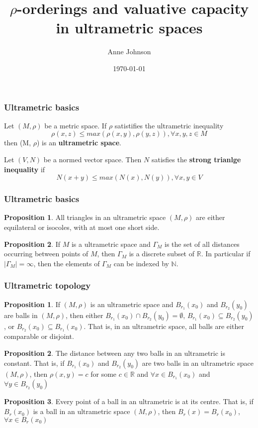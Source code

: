 \documentclass{beamer}
\title{$\rho$-orderings and valuative capacity in ultrametric spaces}
\author{Anne Johnson}
\date{\today}
\theoremstyle{definition}
\newtheorem{proposition}{Proposition}
\newtheorem*{proposition*}{Proposition}
\begin{document}
\maketitle
\begin{frame}
\frametitle{Ultrametric basics}
\begin{definition}
	 Let $(M, \rho)$ be a metric space. If $\rho$ satistifies the ultrametric inequality
	\[\rho(x,z) \leq max{(\rho(x,y), \rho(y,z))}, \forall x,y,z \in M\] 
	then (M, $\rho$) is an \textbf{ultrametric space}.
\end{definition}
\begin{definition}
	 Let $(V, N)$ be a normed vector space. Then $N$ satisfies the \textbf{strong trianlge inequality} if
	\[N(x + y) \leq max(N(x), N(y)), \forall x,y \in V \]
\end{definition}
\end{frame}

\begin{frame}
\frametitle{Ultrametric basics}
\begin{proposition}
	\cite{ar} All triangles in an ultrametric space $(M,\rho)$ are either equilateral or isocoles, with at most one short side. 
\end{proposition}
\begin{proposition}
\cite{ar} If $M$ is a ultrametric space and $\Gamma_M$ is the set of all distances occurring between points of $M$, then $\Gamma_M$ is a discrete subset of $\mathbb{R}$. In particular if $\mid \Gamma_M\mid = \infty$, then the elements of $\Gamma_M$ can be indexed by $\mathbb{N}$.
\end{proposition}

\end{frame}

\begin{frame}
\frametitle{Ultrametric topology}
\begin{proposition*}
\cite{ar} If $(M, \rho)$ is an ultrametric space and $B_{r_1}(x_0)$ and $B_{r_2}(y_0)$ are balls in $(M, \rho)$, then either $B_{r_1}(x_0) \cap B_{r_2}(y_0) = \emptyset$, $B_{r_1}(x_0) \subseteq B_{r_2}(y_0)$, or $B_{r_2}(x_0) \subseteq B_{r_1}(x_0)$. That is, in an ultrametric space, all balls are either comparable or disjoint.
\end{proposition*}
\begin{proposition*}
\cite{ar} The distance between any two balls in an ultrametric is constant. That is, if $B_{r_1}(x_0)$ and $B_{r_2}(y_0)$ are two balls in an ultrametric space $(M,\rho)$, then $\rho(x,y)=c$ for some $c \in \mathbb{R}$ and $\forall x \in B_{r_1}(x_0)$ and $\forall y \in B_{r_2}(y_0)$
\end{proposition*}
\begin{proposition*}
\cite{ar} Every point of a ball in an ultrametric is at its centre. That is, if $B_r(x_0)$ is a ball in an ultrametric space $(M,\rho)$, then $B_r(x)=B_r(x_0)$,  $\forall x \in B_r(x_0)$
\end{proposition*}
\end{frame}
\end{document}
